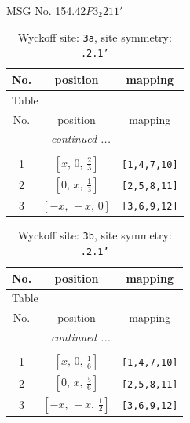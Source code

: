 \documentclass[fleqn,8pt]{jsarticle}
\begin{document}
\setcounter{MaxMatrixCols}{32}

\renewcommand{\tablename}{Table~}
\renewcommand{\figurename}{Figure~}
\begin{center}
\LARGE
MSG No. 154.42\quad$P3_{2}211'$
\end{center}
\renewcommand{\arraystretch}{1.2}
\begin{longtable}{ccc}
\caption{Wyckoff site: {\tt 3a}, site symmetry: {\tt .2.1'}}
 \\
 \hline \hline
No. & position & mapping \\ \hline \endfirsthead

\multicolumn{2}{l}{\tablename\ \thetable{}} \\
 \hline \hline
No. & position & mapping \\ \hline \endhead

 \hline \hline
\multicolumn{2}{r}{\footnotesize\it continued ...} \\ \endfoot

 \hline \hline
\multicolumn{2}{r}{} \\ \endlastfoot

1 & $\left[ x,\, 0,\, \frac{2}{3} \right]$ & {\tt [1,4,7,10]} \\ \hline
2 & $\left[ 0,\, x,\, \frac{1}{3} \right]$ & {\tt [2,5,8,11]} \\ \hline
3 & $\left[ - x,\, - x,\, 0 \right]$ & {\tt [3,6,9,12]} \\
\end{longtable}
\renewcommand{\arraystretch}{1.2}
\begin{longtable}{ccc}
\caption{Wyckoff site: {\tt 3b}, site symmetry: {\tt .2.1'}}
 \\
 \hline \hline
No. & position & mapping \\ \hline \endfirsthead

\multicolumn{2}{l}{\tablename\ \thetable{}} \\
 \hline \hline
No. & position & mapping \\ \hline \endhead

 \hline \hline
\multicolumn{2}{r}{\footnotesize\it continued ...} \\ \endfoot

 \hline \hline
\multicolumn{2}{r}{} \\ \endlastfoot

1 & $\left[ x,\, 0,\, \frac{1}{6} \right]$ & {\tt [1,4,7,10]} \\ \hline
2 & $\left[ 0,\, x,\, \frac{5}{6} \right]$ & {\tt [2,5,8,11]} \\ \hline
3 & $\left[ - x,\, - x,\, \frac{1}{2} \right]$ & {\tt [3,6,9,12]} \\
\end{longtable}
\end{document}
